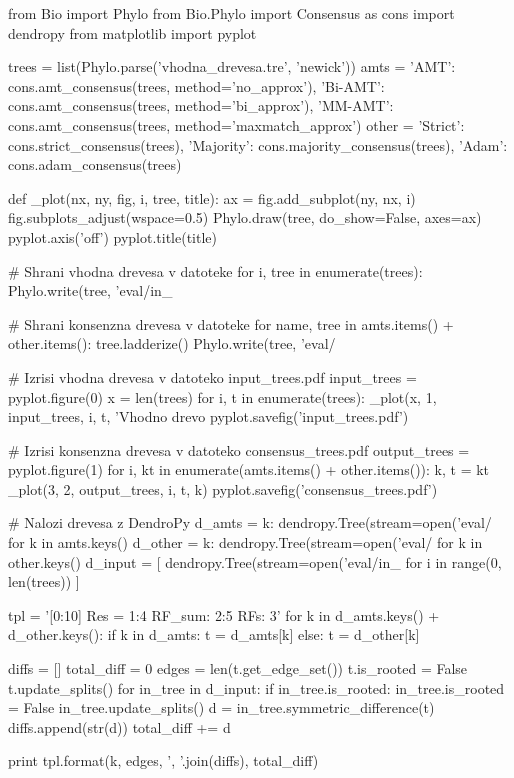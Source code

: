 \documentclass[a4paper, 12pt]{book}
\begin{document}
\begin{python}
from Bio import Phylo
from Bio.Phylo import Consensus as cons
import dendropy
from matplotlib import pyplot

trees = list(Phylo.parse('vhodna_drevesa.tre', 'newick'))
amts = {
    'AMT': cons.amt_consensus(trees, method='no_approx'),
    'Bi-AMT': cons.amt_consensus(trees, method='bi_approx'),
    'MM-AMT': cons.amt_consensus(trees, method='maxmatch_approx')
}
other = {
    'Strict': cons.strict_consensus(trees),
    'Majority': cons.majority_consensus(trees),
    'Adam': cons.adam_consensus(trees)
}

def _plot(nx, ny, fig, i, tree, title):
    ax = fig.add_subplot(ny, nx, i)
    fig.subplots_adjust(wspace=0.5)
    Phylo.draw(tree, do_show=False, axes=ax)
    pyplot.axis('off')
    pyplot.title(title)

# Shrani vhodna drevesa v datoteke
for i, tree in enumerate(trees):
    Phylo.write(tree, 'eval/in_%

# Shrani konsenzna drevesa v datoteke
for name, tree in amts.items() + other.items():
    tree.ladderize()
    Phylo.write(tree, 'eval/%

# Izrisi vhodna drevesa v datoteko input_trees.pdf
input_trees = pyplot.figure(0)
x = len(trees)
for i, t in enumerate(trees):
    _plot(x, 1, input_trees, i, t, 'Vhodno drevo %
pyplot.savefig('input_trees.pdf')

# Izrisi konsenzna drevesa v datoteko consensus_trees.pdf
output_trees = pyplot.figure(1)
for i, kt in enumerate(amts.items() + other.items()):
    k, t = kt
    _plot(3, 2, output_trees, i, t, k)
pyplot.savefig('consensus_trees.pdf')

# Nalozi drevesa z DendroPy
d_amts = {
    k: dendropy.Tree(stream=open('eval/%
    for k in amts.keys()
}
d_other = {
    k: dendropy.Tree(stream=open('eval/%
    for k in other.keys()
}
d_input = [
    dendropy.Tree(stream=open('eval/in_%
    for i in range(0, len(trees))
]

tpl = '[{0:10}] Res = {1:4} RF_sum: {2:5} RFs: {3}'
for k in d_amts.keys() + d_other.keys():
    if k in d_amts:
        t = d_amts[k]
    else:
        t = d_other[k]

    diffs = []
    total_diff = 0
    edges = len(t.get_edge_set())
    t.is_rooted = False
    t.update_splits()
    for in_tree in d_input:
        if in_tree.is_rooted:
            in_tree.is_rooted = False
            in_tree.update_splits()
        d = in_tree.symmetric_difference(t)
        diffs.append(str(d))
        total_diff += d

    print tpl.format(k, edges, ', '.join(diffs), total_diff)
\end{python}
\end{document}
